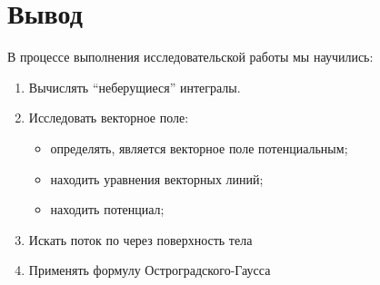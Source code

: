 \section{Вывод}
В процессе выполнения исследовательской работы мы научились:
\begin{enumerate}
  \item Вычислять ``неберущиеся'' интегралы.
  \item Исследовать векторное поле:
    \begin{itemize}
      \item определять, является векторное поле потенциальным;
      \item находить уравнения векторных линий;
      \item находить потенциал;
    \end{itemize}
  \item Искать поток по через поверхность тела
  \item Применять формулу Остроградского-Гаусса
\end{enumerate}
